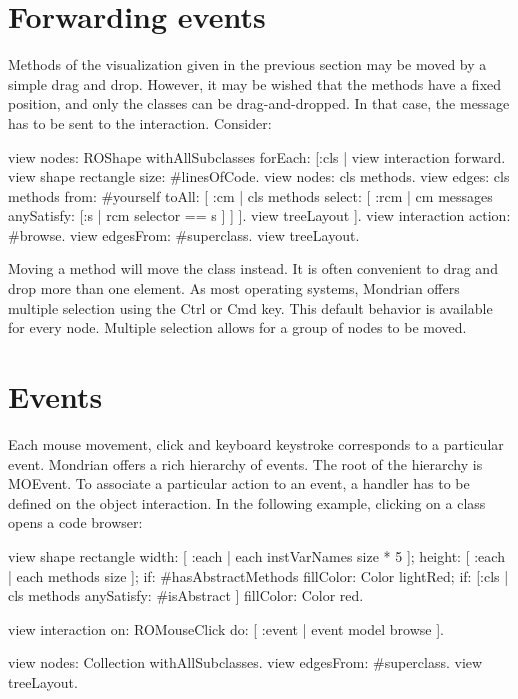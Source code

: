 \documentclass[a4paper,10pt,twoside]{book}
\begin{document}
\section{Forwarding events}

Methods of the visualization given in the previous section may be moved by a simple drag and drop. However, it may be wished that the methods have a fixed position, and only the classes can be drag-and-dropped. In that case, the message  has to be sent to the interaction. Consider:

\begin{code}{}
view nodes: ROShape withAllSubclasses forEach: [:cls |
	view interaction forward.
	view shape rectangle 
					size: #linesOfCode.
	view nodes: cls methods.
	view edges: cls methods from: #yourself toAll: [ :cm | cls methods select: [ :rcm |  cm messages anySatisfy: [:s | rcm selector == s ] ] ].
	view treeLayout
].
view interaction action: #browse.
view edgesFrom: #superclass.
view treeLayout.
\end{code}

Moving a method will move the class instead. It is often convenient to drag and drop more than one element. As most operating systems, Mondrian offers multiple selection using the Ctrl or Cmd key. This default behavior is available for every node. Multiple selection allows for a group of nodes to be moved.


\section{Events}

Each mouse movement, click and keyboard keystroke corresponds to a particular event. Mondrian offers a rich hierarchy of events. The root of the hierarchy is MOEvent. To associate a particular action to an event, a handler has to be defined on the object interaction. In the following example, clicking on a class opens a code browser:

\begin{code}{}
view shape rectangle
  width: [ :each | each instVarNames size * 5 ];
  height: [ :each | each methods size ];
  if: #hasAbstractMethods fillColor: Color lightRed;
  if: [:cls | cls methods anySatisfy: #isAbstract ] fillColor: Color red.
  
view interaction on: ROMouseClick do: [ :event | event model browse ].

view nodes: Collection withAllSubclasses.
view edgesFrom: #superclass.
view treeLayout.
\end{code}
\end{document}

